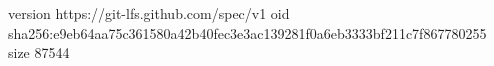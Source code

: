 version https://git-lfs.github.com/spec/v1
oid sha256:e9eb64aa75c361580a42b40fec3e3ac139281f0a6eb3333bf211c7f867780255
size 87544
